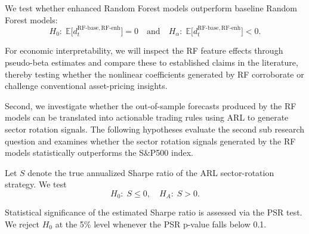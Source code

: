\begin{hyp} \label{hyp:dm3}
We test whether enhanced Random Forest models outperform baseline Random Forest models:
\[
H_{0}:\;\mathbb{E}\bigl[d^{\mathrm{RF\text{-}base,RF\text{-}enh}}_{t}\bigr]=0
\quad\text{and}\quad
H_{\alpha}:\;\mathbb{E}\bigl[d^{\mathrm{RF\text{-}base,RF\text{-}enh}}_{t}\bigr]<0.
\]
\end{hyp}

For economic interpretability, we will inspect the RF feature effects through pseudo-beta estimates and compare these to established claims in the literature, thereby testing whether the nonlinear coefficients generated by RF corroborate or challenge conventional asset-pricing insights.

Second, we investigate whether the out-of-sample forecasts produced by the RF models can be translated into actionable trading rules using ARL to generate sector rotation signals. The following hypotheses evaluate the second sub research question and examines whether the sector rotation signals generated by the RF models statistically outperforms the S\&P500 index.

\begin{hyp} \label{hyp:psr}

Let \(S\) denote the true annualized Sharpe ratio of the ARL sector-rotation strategy. We test
\[
H_{0}:\;S \le 0,\quad H_{A}:\;S > 0.
\]
\end{hyp}

Statistical significance of the estimated Sharpe ratio is assessed via the PSR test. We reject \(H_{0}\) at the 5\% level whenever the PSR p-value falls below 0.1.



